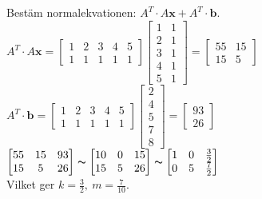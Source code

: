 Bestäm normalekvationen: $A^T\cdot A\mathbf{x}+A^T\cdot\mathbf{b}$.\\
$A^T\cdot A\mathbf{x}=\begin{bmatrix}1&2&3&4&5\\1&1&1&1&1\end{bmatrix}\begin{bmatrix}1&1\\2&1\\3&1\\4&1\\5&1\end{bmatrix}=\begin{bmatrix}55&15\\15&5\end{bmatrix}$\\
$A^T\cdot\mathbf{b}=\begin{bmatrix}1&2&3&4&5\\1&1&1&1&1\end{bmatrix}\begin{bmatrix}2\\4\\5\\7\\8\end{bmatrix}=\begin{bmatrix}93\\26\end{bmatrix}$
$\begin{bmatrix}55&15&93\\15&5&26\end{bmatrix}\thicksim\begin{bmatrix}10&0&15\\15&5&26\end{bmatrix}\thicksim\begin{bmatrix}1&0&\frac{3}{2}\\0&5&\frac{7}{2}\end{bmatrix}$\\
Vilket ger $k=\frac{3}{2},\ m=\frac{7}{10}$.